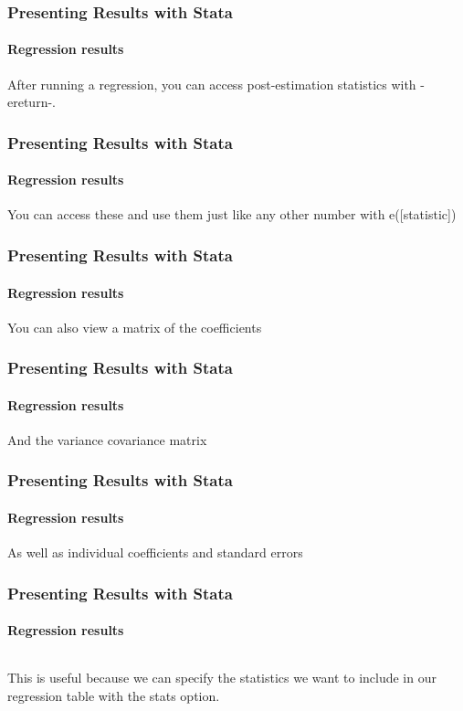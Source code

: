 \documentclass{beamer}
\begin{document}
\begin{frame}
  \frametitle{Presenting Results with Stata}
  \framesubtitle{Regression results}
After running a regression, you can access post-estimation statistics with -ereturn-.



\end{frame}



\begin{frame}
  \frametitle{Presenting Results with Stata}
  \framesubtitle{Regression results}
You can access these and use them just like any other number with e([statistic])



\end{frame}

\begin{frame}
  \frametitle{Presenting Results with Stata}
  \framesubtitle{Regression results}
You can also view a matrix of the coefficients



\end{frame}

\begin{frame}
  \frametitle{Presenting Results with Stata}
  \framesubtitle{Regression results}
And the variance covariance matrix



\end{frame}

\begin{frame}
  \frametitle{Presenting Results with Stata}
  \framesubtitle{Regression results}
As well as individual coefficients and standard errors


\end{frame}



\begin{frame}
  \frametitle{Presenting Results with Stata}
  \framesubtitle{Regression results}

\begin{columns}[onlytextwidth]
  \begin{column}{5.5cm}
This is useful because we can specify the statistics we want to include in our regression table with the stats option.

\normalsize

  \end{column}
  \begin{column}{6cm}



  \end{column}
\end{columns}

\end{frame}
\end{document}
